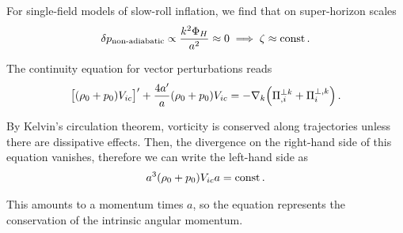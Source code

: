 \documentclass[main.tex]{subfiles}
\begin{document}
For single-field models of slow-roll inflation, we find that on super-horizon scales
%
\begin{align}
\delta p _{\text{non-adiabatic}} \propto \frac{k^2 \Phi _H}{a^2} \approx 0 \implies \zeta \approx \text{const} 
\,.
\end{align}

The continuity equation for vector perturbations reads 
%
\begin{align}
\qty[(\rho_0 +p_0 ) V_{ic}]' + \frac{4 a'}{a} (\rho_0 + p_0 ) V_{ic} 
= - \nabla_k \qty(\Pi^{\perp k}_{, i} + \Pi^{\perp, k}_{i})
\,.
\end{align}

By Kelvin's circulation theorem, vorticity is conserved along trajectories unless there are dissipative effects.
Then, the divergence on the right-hand side of this equation vanishes, therefore we can write the left-hand side as 
%
\begin{align}
a^3 \qty(\rho_0 + p_0 ) V_{ic} a = \text{const}
\,.
\end{align}

This amounts to a momentum times \(a\), so the equation represents the conservation of the intrinsic angular momentum. 
\end{document}

